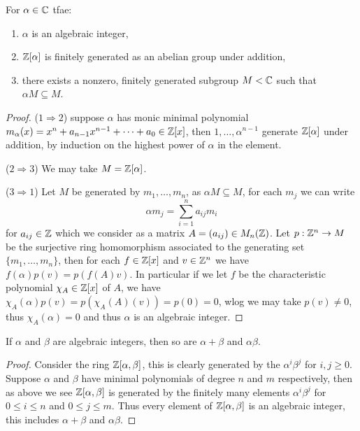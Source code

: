 \documentclass{article}
\begin{document}
\begin{proposition}
    For $\alpha\in\mathbb{C}$ tfae:\begin{enumerate}
        \item $\alpha$ is an algebraic integer,
        \item $\mathbb{Z}[\alpha]$ is finitely generated as an abelian group under addition,
        \item there exists a nonzero, finitely generated subgroup $M<\mathbb{C}$ such that $\alpha M\subseteq M$.
    \end{enumerate}
    \begin{proof}
        ($1\Rightarrow 2$) suppose $\alpha$ has monic minimal polynomial $m_\alpha(x)=x^n+a_{n-1}x^{n-1}+\cdots+a_0\in\mathbb{Z}[x]$, then $1,\ldots,\alpha^{n-1}$ generate $\mathbb{Z}[\alpha]$ under addition, by induction on the highest power of $\alpha$ in the element.

        ($2\Rightarrow 3$) We may take $M=\mathbb{Z}[\alpha]$.

        ($3\Rightarrow 1$) Let $M$ be generated by $m_1,\ldots,m_n$, as $\alpha M\subseteq M$, for each $m_j$ we can write \[
        \alpha m_j = \sum_{i=1}^n a_{ij}m_i
        \] for $a_{ij}\in \mathbb{Z}$ which we consider as a matrix $A=(a_{ij})\in M_n(\mathbb{Z})$. Let $p:\mathbb{Z}^n\rightarrow M$ be the surjective ring homomorphism associated to the generating set $\{m_1,\ldots,m_n\}$, then for each $f\in\mathbb{Z}[x]$ and $v\in\mathbb{Z}^n$ we have $f(\alpha)p(v)=p(f(A)v)$. In particular if we let $f$ be the characteristic polynomial $\chi_A\in\mathbb{Z}[x]$ of $A$, we have $\chi_A(\alpha)p(v)=p(\chi_A(A)(v))=p(0)=0$, wlog we may take $p(v)\neq 0$, thus $\chi_A(\alpha)=0$ and thus $\alpha$ is an algebraic integer.
    \end{proof}
\end{proposition}

\begin{proposition}
    If $\alpha$ and $\beta$ are algebraic integers, then so are $\alpha+\beta$ and $\alpha\beta$.
    \begin{proof}
        Consider the ring $\mathbb{Z}[\alpha,\beta]$, this is clearly generated by the $\alpha^i\beta^j$ for $i,j\geq 0$. Suppose $\alpha$ and $\beta$ have minimal polynomials of degree $n$ and $m$ respectively, then as above we see $\mathbb{Z}[\alpha,\beta]$ is generated by the finitely many elements $\alpha^i\beta^j$ for $0\leq i\leq n$ and $0\leq j \leq m$. Thus every element of $\mathbb{Z}[\alpha,\beta]$ is an algebraic integer, this includes $\alpha+\beta$ and $\alpha\beta$.
    \end{proof}
\end{proposition}
\end{document}
